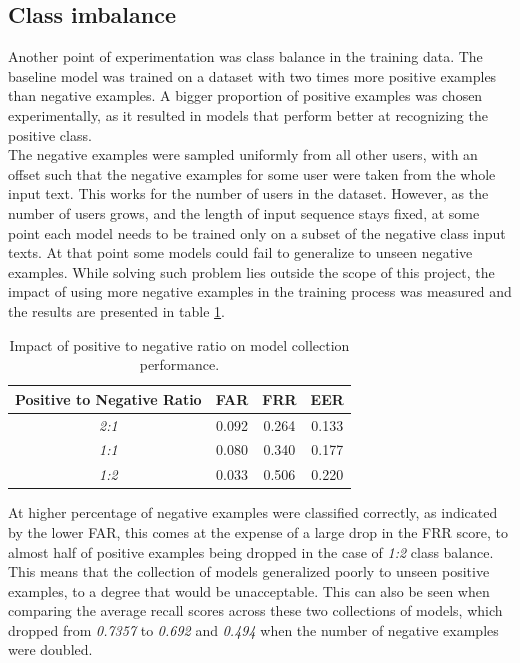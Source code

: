 \subsection{Class imbalance}
Another point of experimentation was class balance in the training data. The baseline model was trained on a dataset with two times more positive examples than negative examples. A bigger proportion of positive examples was chosen experimentally, as it resulted in models that perform better at recognizing the positive class. \\ 
The negative examples were sampled uniformly from all other users, with an offset such that the negative examples for some user were taken from the whole input text. This works for the number of users in the dataset. However, as the number of users grows, and the length of input sequence stays fixed, at some point each model needs to be trained only on a subset of the negative class input texts. At that point some models could fail to generalize to unseen negative examples. 
While solving such problem lies outside the scope of this project, the impact of using more negative examples in the training process was measured and the results are presented in table \ref{table:egde_encoding_comp}.


\begin{center}
	\begin{table}[H]
		\begin{center}
			\begin{tabular}{ |c|c|c|c| } 
				\hline
				Positive to Negative Ratio & FAR & FRR & EER \\
				\hline
				\textit{2:1} & 0.092 & 0.264 & 0.133 \\
				\hline
				\textit{1:1} & 0.080 & 0.340 & 0.177 \\
				\hline
				\textit{1:2} & 0.033 & 0.506 & 0.220 \\
				\hline
			\end{tabular}
		\end{center}
		\caption{Impact of positive to negative ratio on model collection performance.}
		\label{table:egde_encoding_comp}
	\end{table}
\end{center}

At higher percentage of negative examples were classified correctly, as indicated by the lower FAR, this comes at the expense of a large drop in the FRR score, to almost half of positive examples being dropped in the case of \textit{1:2} class balance. This means that the collection of models generalized poorly to unseen positive examples, to a degree that would be unacceptable. This can also be seen when comparing the average recall scores across these two collections of models, which dropped from \textit{0.7357} to \textit{0.692} and \textit{0.494} when the number of negative examples were doubled. 


